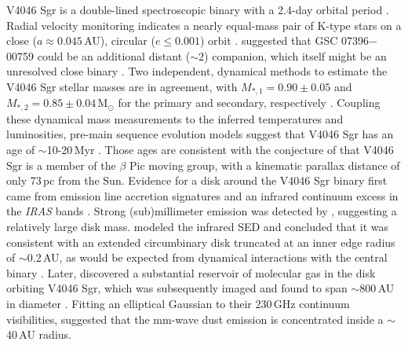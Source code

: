 {V4046 Sgr is a double-lined spectroscopic binary with a 2.4-day orbital period 
\citep{byrne86,delareza86,quast00,stempels04}.  Radial velocity monitoring
indicates a nearly equal-mass pair of K-type stars on a close ($a \approx 
0.045$\,AU), circular ($e \le 0.001$) orbit \citep{stempels13}.
\citet{kastner11} suggested that GSC 07396$-$00759 could be an additional
distant ($\sim$2) companion, which itself might be an unresolved close
binary \citep[see also][]{nataf10}.  Two independent, dynamical methods to
estimate the V4046 Sgr stellar masses are in agreement, with $M_{\ast,1} = 
0.90\pm0.05$ and $M_{\ast,2} = 0.85\pm0.04$\,M$_{\odot}$ for the primary and
secondary, respectively \citep{rosenfeld12,stempels13}.  Coupling these
dynamical mass measurements to the inferred temperatures and luminosities,
pre-main sequence evolution models suggest that V4046 Sgr has an age of
$\sim$10-20\,Myr \citep{rodriguez10,donati11,rosenfeld12}.  Those ages are 
consistent with the conjecture of \citet{torres06,torres08} that V4046 Sgr is a 
member of the $\beta$ Pic moving group, with a kinematic parallax distance of 
only 73\,pc from the Sun.  Evidence for a disk around the V4046 Sgr binary first
came from emission line accretion signatures \citep[H$\alpha$ equivalent widths 
of $\sim$30-120\AA;][]{merrill50,henize76,hbc88} and an infrared continuum 
excess in the {\it IRAS} bands \citep[e.g.,][]{johnson86,weintraub90,weaver92}. 
Strong (sub)millimeter emission was detected by \citet{jensen96}, suggesting a 
relatively large disk mass.  \citet{jensen97} modeled the infrared SED and 
concluded that it was consistent with an extended circumbinary disk truncated at
an inner edge radius of $\sim$0.2\,AU, as would be expected from dynamical 
interactions with the central binary \citep[e.g.,][]{artymowicz94}.  Later, 
\citet{kastner08} discovered a substantial reservoir of molecular gas in the 
disk orbiting V4046 Sgr, which was subsequently imaged and found to span 
$\sim$800\,AU in diameter 
\citep[roughly 10\arcsec\ on the sky;][]{rodriguez10,oberg11,rosenfeld12}.  
Fitting an elliptical Gaussian to their 230\,GHz continuum visibilities, 
\citet{rodriguez10} suggested that the mm-wave dust emission 
is concentrated inside a $\sim$40\,AU radius.

}
